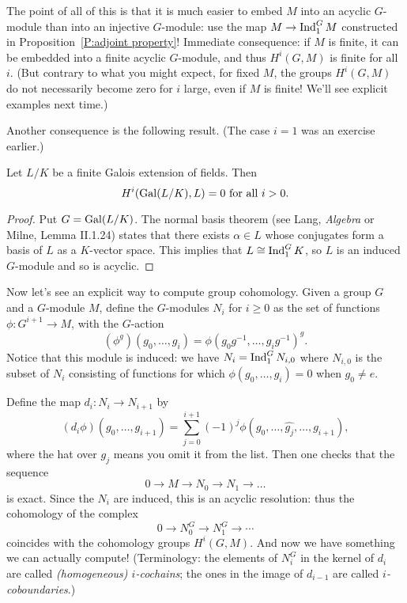 The point of all of this is that it is much easier to embed $M$ into an acyclic $G$-module than into an injective $G$-module: use the map $M \to \operatorname{Ind}^G_1 M$ constructed in
Proposition~\ref{P:adjoint property}!
Immediate consequence: if $M$ is finite, it can be embedded into a
finite acyclic $G$-module, and thus $H^i(G,M)$ is finite for all $i$. (But
contrary to what you might expect, for fixed $M$, the groups $H^i(G,M)$
do not necessarily become zero for $i$ large, even if $M$ is finite! 
We'll see explicit examples next time.)

Another consequence is the following result. (The case $i=1$ was an exercise earlier.)
\begin{theorem} \label{T:additive theorem 90}
Let $L/K$ be a finite Galois extension of fields. Then
\[
H^i(\operatorname{Gal}(L/K), L) = 0 \mbox{ for all $i>0$.}
\]
\end{theorem}
\begin{proof}
Put $G = \operatorname{Gal}(L/K)$.
The normal basis theorem (see Lang, \emph{Algebra} or Milne, Lemma
II.1.24)
states that there exists $\alpha \in L$ whose conjugates form a basis of
$L$ as a $K$-vector space. This implies that $L \cong \operatorname{Ind}^{G}_{1}
K$, so $L$ is an induced $G$-module and so is acyclic.
\end{proof}

Now let's see an explicit way to compute group cohomology.
Given a group $G$ and a $G$-module $M$, define the $G$-modules $N_i$
for $i \geq 0$ as the set of functions $\phi: G^{i+1} \to M$, with the $G$-action
\[
(\phi^g)(g_0, \dots, g_i) = \phi(g_0g^{-1}, \dots, g_ig^{-1})^g.
\]
Notice that this module is induced: we have $N_i = \operatorname{Ind}_{1}^G N_{i,0}$
where $N_{i,0}$ is the subset of $N_i$ consisting of functions for which
$\phi(g_0, \dots, g_i) = 0$ when $g_0 \neq e$.

Define the map $d_i: N_i \to N_{i+1}$ by
\[
(d_i \phi)(g_0, \dots, g_{i+1})
= \sum_{j=0}^{i+1} (-1)^j \phi(g_0, \dots, \widehat{g_j}, \dots, g_{i+1}),
\]
where the hat over $g_j$ means you omit it from the list.
Then one checks that the sequence
\[
0 \to M \to N_0 \to N_1 \to \dots
\]
is exact. Since the $N_i$ are induced, this is an acyclic resolution:
thus the cohomology of the complex
\[
0 \to N_0^G \to N_1^G \to \cdots
\]
coincides with the cohomology groups $H^i(G, M)$. And now we have
something we can actually compute! (Terminology: the elements of
$N_i^G$ in the kernel of $d_i$ are called \emph{(homogeneous) $i$-cochains};
the ones in the image of $d_{i-1}$ are called \emph{$i$-coboundaries}.)

